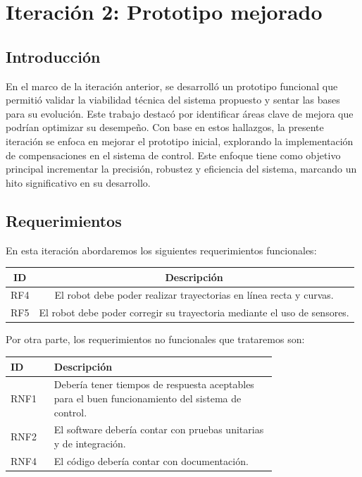 \newpage
\section{Iteración 2: Prototipo mejorado}

\subsection{Introducción}
En el marco de la iteración anterior, se desarrolló un prototipo funcional que permitió validar la viabilidad técnica del sistema propuesto y sentar las bases para su evolución. Este trabajo destacó por identificar áreas clave de mejora que podrían optimizar su desempeño. Con base en estos hallazgos, la presente iteración se enfoca en mejorar el prototipo inicial, explorando la implementación de compensaciones en el sistema de control. Este enfoque tiene como objetivo principal incrementar la precisión, robustez y eficiencia del sistema, marcando un hito significativo en su desarrollo.

\subsection{Requerimientos}
En esta iteración abordaremos los siguientes requerimientos funcionales:

\begin{center} \begin{tabular}{|c|c|}
\hline
    ID & Descripción \\
\hline
    RF4 & El robot debe poder realizar trayectorias en línea recta y curvas. \\ 
\hline
    RF5 & El robot debe poder corregir su trayectoria mediante el uso de sensores. \\ 
\hline
\end{tabular} \end{center}

Por otra parte, los requerimientos no funcionales que trataremos son:

\begin{center} \begin{tabular}{|p{0.10\linewidth}|p{0.65\linewidth}|}
\hline
    ID & Descripción \\
\hline
    RNF1 & Debería tener tiempos de respuesta aceptables para el buen funcionamiento del sistema de control. \\
\hline
    RNF2 & El software debería contar con pruebas unitarias y de integración. \\
\hline
    RNF4 & El código debería contar con documentación.\\
\hline
\end{tabular} \end{center}

